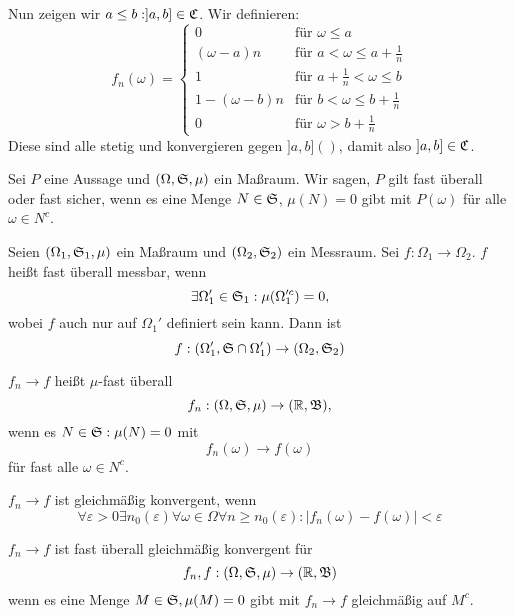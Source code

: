 \begin{bew}
\begin{itemize}
\begin{itemize}
					\end{itemize}
					Nun zeigen wir $a\le b: ]a,b]\in\mathfrak{C}$. Wir definieren:
					\[ f_n(\omega)=\left\{\begin{array}{ll}
					0&\text{für } \omega \le a\\
					(\omega-a)n&\text{für }a<\omega\le a+\frac{1}{n}\\
					1&\text{für }a+\frac{1}{n}<\omega\le b\\
					1-(\omega-b)n&\text{für }b<\omega\le b+\frac{1}{n}\\
					0&\text{für } \omega >b+\frac{1}{n}
					\end{array}\right. \]
					Diese sind alle stetig und konvergieren gegen $]a,b]()$, damit also $]a,b]\in\mathfrak{C}$. 
				\end{itemize}
			\end{bew}
			
			\begin{defi}
				Sei $P$ eine Aussage und $(\Omega,\mathfrak{S}, \mu)$ ein Maßraum. Wir sagen, $P$ gilt fast überall oder fast sicher, wenn es eine Menge $N\in\mathfrak{S}$, $\mu(N)=0$ gibt mit $P(\omega)$ für alle $\omega \in N^c$.
			\end{defi}
			
			\begin{defi}
				Seien $(\Omega_1,\mathfrak{S}_1,\mu)$ ein Maßraum und $(\Omega_2,\mathfrak{S}_2)$ ein Messraum. Sei $f:\Omega_1\to\Omega_2$. $f$ heißt fast überall messbar, wenn
				\[ \exists \Omega_1'\in\mathfrak{S}_1: \mu(\Omega_1'^c)=0, \]
				wobei $f$ auch nur auf $\Omega_1'$ definiert sein kann. Dann ist
				\[ f:(\Omega_1',\mathfrak{S}\cap\Omega_1')\to(\Omega_2,\mathfrak{S}_2) \]
			\end{defi}
			
			\begin{defi}
				$f_n\to f$ heißt $\mu$-fast überall
				\[ f_n: (\Omega,\mathfrak{S},\mu)\to(\mathbb{R},\mathfrak{B}), \]
				wenn es $N\in\mathfrak{S}:\mu(N)=0$ mit 
				\[ f_n(\omega)\to f(\omega) \]
				für fast alle $\omega\in N^c$. 
			\end{defi}
			
			\begin{defi}
				$f_n\to f$ ist gleichmäßig konvergent, wenn
				\[ \forall \varepsilon>0\exists n_0(\varepsilon)\forall \omega\in\Omega\forall n\ge n_0(\varepsilon): |f_n(\omega)-f(\omega)|<\varepsilon \]
			\end{defi}
			
			\begin{defi}
				$f_n\to f$ ist fast überall gleichmäßig konvergent für
				\[ f_n,f:(\Omega,\mathfrak{S},\mu)\to (\mathbb{R},\mathfrak{B}) \]
				wenn es eine Menge $M\in\mathfrak{S},\mu(M)=0$ gibt mit $f_n\to f$ gleichmäßig auf $M^c$. 
			\end{defi}
			
